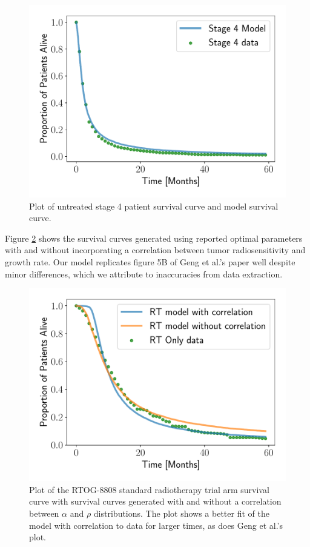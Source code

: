 \documentclass[letterpaper
, superscriptaddress
, twocolumn
, aps
]{revtex4}
\begin{document}
\begin{figure}
	\includegraphics[width=1.00\columnwidth]{Figures/stage4.pdf}
		\caption{Plot of untreated stage 4 patient survival curve and model survival curve.}
		\label{s4}
\end{figure}

Figure \ref{rad_therapy} shows the survival curves generated using reported optimal parameters with and without incorporating a correlation between tumor radiosensitivity and growth rate. Our model replicates figure 5B of Geng et al.'s paper well despite minor differences, which we attribute to inaccuracies from data extraction.

\begin{figure}[h!]
	\includegraphics[width=1.00\columnwidth]{Figures/radiotherapy.pdf}
	\caption{Plot of the RTOG-8808 standard radiotherapy trial arm survival curve with survival curves generated with and without a correlation between $\alpha$ and $\rho$ distributions. The plot shows a better fit of the model with correlation to data for larger times, as does Geng et al.'s plot.}
	\label{rad_therapy}
\end{figure}
\end{document}
